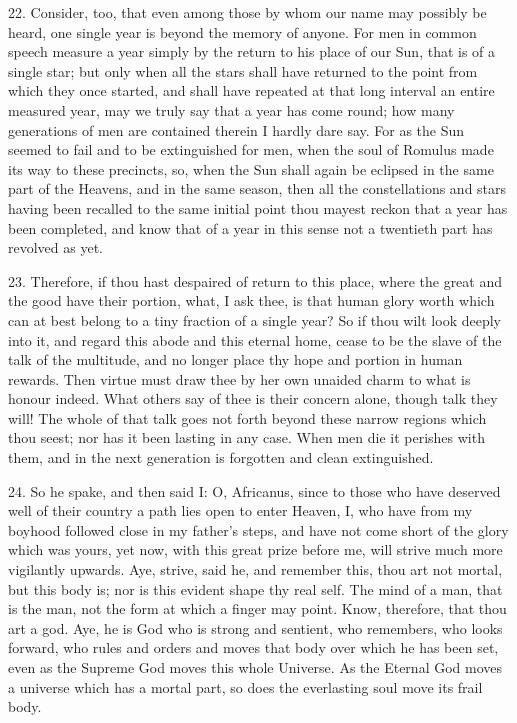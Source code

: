 \documentclass[a4paper, 11pt, oneside, polutonikogreek, english]{article}
\begin{document}
22. Consider, too, that even among those by whom our name may possibly be heard, one single year is beyond the memory of anyone. For men in common speech measure a year simply by the return to his place of our Sun, that is of a single star; but only when all the stars shall have returned to the point from which they once started, and shall have repeated at that long interval an entire measured year, may we truly say that a year has come round; how many generations of men are contained therein I hardly dare say. For as the Sun seemed to fail and to be extinguished for men, when the soul of Romulus made its way to these precincts, so, when the Sun shall again be eclipsed in the same part of the Heavens, and in the same season, then all the constellations and stars having been recalled to the same initial point thou mayest reckon that a year has been completed, and know that of a year in this sense not a twentieth part has revolved as yet.

23. Therefore, if thou hast despaired of return to this place, where the great and the good have their portion, what, I ask thee, is that human glory worth which can at best belong to a tiny fraction of a single year? So if thou wilt look deeply into it, and regard this abode and this eternal home, cease to be the slave of the talk of the multitude, and no longer place thy hope and portion in human rewards. Then virtue must draw thee by her own unaided charm to what is honour indeed. What others say of thee is their concern alone, though talk they will! The whole of that talk goes not forth beyond these narrow regions which thou seest; nor has it been lasting in any case. When men die it perishes with them, and in the next generation is forgotten and clean extinguished.

24. So he spake, and then said I: O, Africanus, since to those who have deserved well of their country a path lies open to enter Heaven, I, who have from my boyhood followed close in my father's steps, and have not come short of the glory which was yours, yet now, with this great prize before me, will strive much more vigilantly upwards. Aye, strive, said he, and remember this, thou art not mortal, but this body is; nor is this evident shape thy real self. The mind of a man, that is the man, not the form at which a finger may point. Know, therefore, that thou art a god. Aye, he is God who is strong and sentient, who remembers, who looks forward, who rules and orders and moves that body over which he has been set, even as the Supreme God moves this whole Universe. As the Eternal God moves a universe which has a mortal part, so does the everlasting soul move its frail body.
\end{document}
